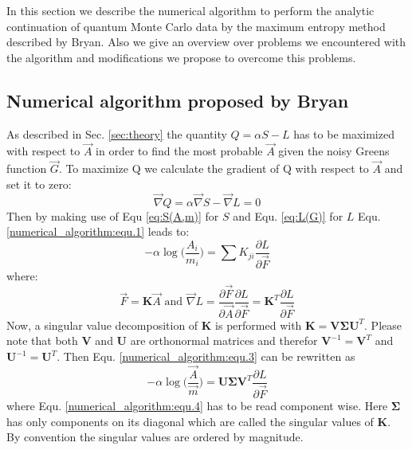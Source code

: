 In this section we describe the numerical algorithm to perform the analytic continuation of quantum Monte Carlo data by the maximum entropy method described by Bryan.
Also we give an overview over problems we encountered with the algorithm and modifications we propose to overcome this problems.
\subsection*{Numerical algorithm proposed by Bryan}
As described in Sec. \ref{sec:theory} the quantity $Q = \alpha S - L$ has to be maximized with respect to $\vec A$ in order to find the most probable $\vec A$ given the noisy Greens function $\vec G$.\newline
To maximize Q we calculate the gradient of Q with respect to $\vec A$ and set it to zero:
\begin{equation}
	\vec\nabla Q =  \alpha \vec\nabla S - \vec\nabla L = 0
	\label{numerical_algorithm:equ.1}
\end{equation}
Then by making use of Equ \ref{eq:S(A,m)} for $S$ and Equ. \ref{eq:L(G)} for $L$ Equ. \ref{numerical_algorithm:equ.1} leads to:
\begin{equation}
	- \alpha \log \bigg(\frac{A_i}{m_i} \bigg) = \sum K_{ji} \frac{\partial L}{\partial \vec F}
	\label{numerical_algorithm:equ.2}
\end{equation}
where:
\begin{equation}
	\vec F = \mathbf{K} \vec A \text{ and } \vec \nabla L = \frac{\partial \vec F}{\partial \vec A} \frac{\partial L}{\partial \vec F} = \mathbf{K}^T \frac{\partial L}{\partial \vec F}
	\label{numerical_algorithm:equ.3}
\end{equation}
Now, a singular value decomposition of $\mathbf{K}$ is performed with $\mathbf{K} = \mathbf{V} \mathbf{\Sigma} \mathbf{U}^T$. Please note that both $\mathbf{V}$ and $\mathbf{U}$ are orthonormal matrices and therefor $\mathbf{V}^{-1}=\mathbf{V}^T$ and $\mathbf{U}^{-1}=\mathbf{U}^T$.\newline
Then Equ. \ref{numerical_algorithm:equ.3} can be rewritten as
\begin{equation}
	-\alpha \log \bigg(\frac{\vec A}{\vec m}\bigg) = \mathbf{U} \mathbf{\Sigma} \mathbf{V}^T \frac{\partial L}{\partial \vec F} 
	\label{numerical_algorithm:equ.4}
\end{equation}
where Equ. \ref{numerical_algorithm:equ.4} has to be read component wise.
Here $\mathbf{\Sigma}$ has only components on its diagonal which are called the singular values of $\mathbf{K}$. By convention the singular values are ordered by magnitude.\newline
